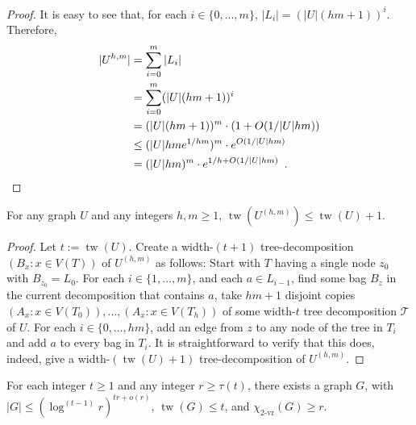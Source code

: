 \documentclass[kpfonts]{patmorin}
\DeclareMathOperator{\tw}{tw}
\newcommand{\rn}[1]{\chi_{\operatorname{#1-vr}}}
\newcommand{\trn}{\rn{2}}
\theoremstyle{named}
\begin{document}
\begin{proof}
    It is easy to see that, for each $i\in \{0,\ldots,m\}$, $|L_i|=(|U|(hm+1))^i$.  Therefore,
    \begin{align*}
      |U^{h,m}|
        & = \sum_{i=0}^m |L_i| \\
        & = \sum_{i=0}^m (|U|(hm+1))^i \\
        & = (|U|(hm+1))^{m}\cdot (1+O(1/|U|hm)) \\
        & \le (|U|hme^{1/hm})^{m}\cdot e^{O(1/|U|hm)} \\
        & = (|U|hm)^{m}\cdot e^{1/h+O(1/|U|hm)}
        \enspace . \qedhere
    \end{align*}
\end{proof}


\begin{lem}\label{boost-treewidth}
    For any graph $U$ and any integers $h,m\ge 1$, $\tw(U^{(h,m)})\le \tw(U)+1$.
\end{lem}

\begin{proof}
  Let $t:=\tw(U)$.
  Create a width-$(t+1)$ tree-decomposition $(B_x:x\in V(T))$ of $U^{(h,m)}$ as follows: Start with $T$ having a single node $z_0$ with $B_{z_0}=L_0$.  For each $i\in\{1,\ldots,m\}$, and each $a\in L_{i-1}$, find some bag $B_z$ in the current decomposition that contains $a$, take $hm+1$ disjoint copies $(A_x:x\in V(T_0)),\ldots,(A_x:x\in V(T_h))$ of some width-$t$ tree decomposition $\mathcal{T}$ of $U$.  For each $i\in\{0,\ldots,hm\}$, add an edge from $z$ to any node of the tree in $T_i$ and add $a$ to every bag in $T_i$.  It is straightforward to verify that this does, indeed, give a width-$(\tw(U)+1)$ tree-decomposition of $U^{(h,m)}$.
\end{proof}


\begin{lem}\label{treewidth-lower-bound}
    For each integer $t\ge 1$ and any integer $r\ge \tau(t)$, there exists a graph $G$, with $|G|\le (\log^{(t-1)}r)^{tr + o(r)}$, $\tw(G)\le t$, and $\trn(G)\ge r$.
\end{lem}
\end{document}
